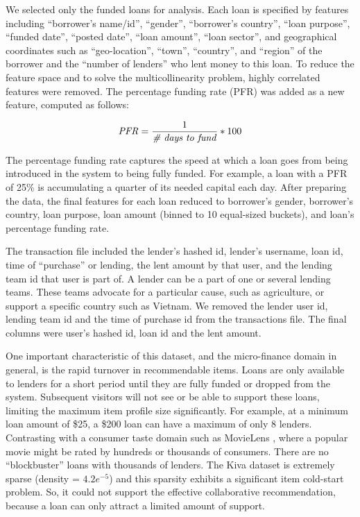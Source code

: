     We selected only the funded loans for analysis. Each loan is specified by features including ``borrower's name/id'', ``gender'', ``borrower's country'', ``loan purpose'', ``funded date'', ``posted date'', ``loan amount'', ``loan sector'', and geographical coordinates such as ``geo-location'', ``town'', ``country'', and ``region'' of the borrower and the ``number of lenders'' who lent money to this loan. To reduce the feature space and to solve the multicollinearity problem, highly correlated features were removed. The percentage funding rate (PFR) was added as a new feature, computed as follows:
    
    \begin{equation}
     \mbox{\textit{PFR}} =  \frac{1}{\mbox{\textit{{\#} days to fund}}} * 100 
    \end{equation}
    \vspace{0.25cm}
    
    The percentage funding rate captures the speed at which a loan goes from being introduced in the system to being fully funded. For example, a loan with a PFR of 25\% is accumulating a quarter of its needed capital each day. After preparing the data, the final features for each loan reduced to borrower's gender, borrower's country, loan purpose, loan amount (binned to 10 equal-sized buckets), and loan's percentage funding rate. 
    
    The transaction file included the lender's hashed id, lender's username, loan id, time of ``purchase'' or lending, the lent amount by that user, and the lending team id that user is part of. A lender can be a part of one or several lending teams. These teams advocate for a particular cause, such as agriculture, or support a specific country such as Vietnam. We removed the lender user id, lending team id and the time of purchase id from the transactions file. The final columns were user's hashed id, loan id and the lent amount.
    
    One important characteristic of this dataset, and the micro-finance domain in general, is the rapid turnover in recommendable items. Loans are only available to lenders for a short period until they are fully funded or dropped from the system. Subsequent visitors will not see or be able to support these loans, limiting the maximum item profile size significantly. For example, at a minimum loan amount of \$25, a \$200 loan can have a maximum of only 8 lenders. Contrasting with a consumer taste domain such as MovieLens \cite{movielens}, where a popular movie might be rated by hundreds or thousands of consumers. There are no ``blockbuster'' loans with thousands of lenders. The Kiva dataset is extremely sparse (density = $4.2e^{-5}$) and this sparsity exhibits a significant item cold-start problem. So, it could not support the effective collaborative recommendation, because a loan can only attract a limited amount of support. 
    
